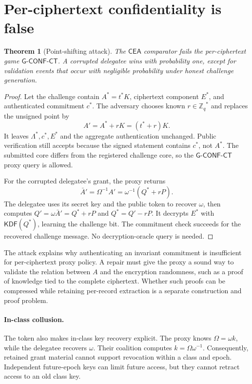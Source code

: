 \documentclass[11pt,letterpaper]{article}
\newtheorem{theorem}{Theorem}[section]
\theoremstyle{definition}
\theoremstyle{remark}
\newcommand{\CEA}{\ensuremath{\mathsf{CEA}}\xspace}
\newcommand{\GCT}{\ensuremath{\mathsf{G\text{-}CONF\text{-}CT}}\xspace}
\newcommand{\Zq}{\ensuremath{\mathbb{Z}_q}}
\newcommand{\KDF}{\ensuremath{\mathsf{KDF}}}
\begin{document}
\section{Per-ciphertext confidentiality is false}
\label{sec:attack}

\begin{theorem}[Point-shifting attack]
The \CEA comparator fails the per-ciphertext game \GCT.  A corrupted delegatee wins with
probability one, except for validation events that occur with negligible
probability under honest challenge generation.
\end{theorem}

\begin{proof}
Let the challenge contain \(A^*=t^*K\), ciphertext component \(E^*\), and
authenticated commitment \(c^*\).  The adversary chooses known
\(r\in\Zq^*\) and replaces the unsigned point by
\[
 A'=A^*+rK=(t^*+r)K.
\]
It leaves \(\Lambda^*,c^*,E^*\) and the aggregate authentication unchanged.
Public verification still accepts because the signed statement contains \(c^*\),
not \(A^*\).  The submitted core differs from the registered challenge core, so
the \GCT proxy query is allowed.

For the corrupted delegatee's grant, the proxy returns
\[
 \bar A'=\Omega^{-1}A'=\omega^{-1}(Q^*+rP).
\]
The delegatee uses its secret key and the public token to recover \(\omega\),
then computes \(Q'=\omega\bar A'=Q^*+rP\) and
\(Q^*=Q'-rP\).  It decrypts \(E^*\) with \(\KDF(Q^*)\), learning the challenge
bit.  The commitment check succeeds for the recovered challenge message.  No
decryption-oracle query is needed.
\end{proof}

The attack explains why authenticating an invariant commitment is insufficient
for per-ciphertext proxy policy.  A repair must give the proxy a sound way to
validate the relation between \(A\) and the encryption randomness, such as a
proof of knowledge tied to the complete ciphertext.  Whether such proofs can be
compressed while retaining per-record extraction is a separate construction and
proof problem.

\paragraph{In-class collusion.}
The token also makes in-class key recovery explicit.  The proxy knows
\(\Omega=\omega k\), while the delegatee recovers \(\omega\).  Their coalition
computes \(k=\Omega\omega^{-1}\).  Consequently, retained grant material cannot
support revocation within a class and epoch.  Independent future-epoch keys can
limit future access, but they cannot retract access to an old class key.
\end{document}
